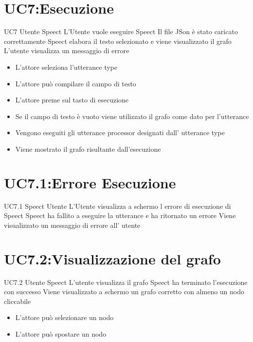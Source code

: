 \documentclass[../AnalisideiRequisiti.tex]{subfiles}
\begin{document}
\section{UC7:Esecuzione}
\UserCase
{UC7}
{Utente}
{Speect}
{L'Utente vuole eseguire Speect}
{Il file JSon è stato caricato correttamente}
{Speect elabora il testo selezionato e viene visualizzato il grafo}
{L'utente visualizza un messaggio di errore }
{\begin{itemize}
		\item{} L'attore seleziona l'utterance type
		\item{} L'attore può compilare il campo di testo
		\item{} L'attore preme sul tasto di esecuzione
		\item{} Se il campo di testo è vuoto viene utilizzato il grafo come dato per l'utterance
		\item{} Vengono eseguiti gli utterance processor designati dall' utterance type
		\item{} Viene mostrato il grafo risultante dall'esecuzione
	\end{itemize}
}

\section{UC7.1:Errore Esecuzione}
\UserCase
{UC7.1}
{Speect}
{Utente}
{L'Utente visualizza a schermo l errore di esecuzione di Speect }
{Speect ha fallito a eseguire la utterance e ha ritornato un errore}
{Viene visualizzato un messaggio di errore all' utente}
{}
{}
\section{UC7.2:Visualizzazione del grafo}
\UserCase
{UC7.2}
{Utente}
{Speect}
{L'utente visualizza il grafo}
{Speect ha terminato l'esecuzione con successo}
{Viene visualizzato a schermo un grafo corretto con almeno un nodo cliccabile}
{}
{
	\begin{itemize}
		\item{} L'attore può selezionare un nodo 
		\item{} L'attore può spostare un nodo 
	\end{itemize}
}
\end{document}
